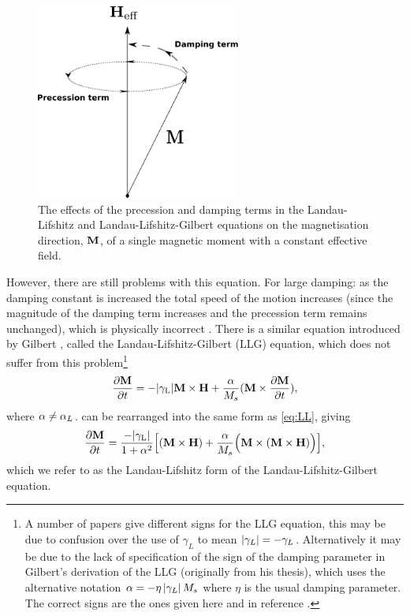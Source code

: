 \begin{figure}
  \centering
  \includegraphics[width=0.6\textwidth]{./images/LLG-terms}
  \caption{The effects of the precession and damping terms in the Landau-Lifshitz and Landau-Lifshitz-Gilbert equations on the magnetisation direction, $\boldsymbol{\mathrm{M}}$, of a single magnetic moment with a constant effective field.}
  \label{fig:LLG-terms}
\end{figure}

However, there are still problems with this equation.
For large damping: as the damping constant is increased the total speed of the motion increases (since the magnitude of the damping term increases and the precession term remains unchanged), which is physically incorrect \cite{Mallinson1987}.
There is a similar equation introduced by Gilbert \cite{Gilbert2004}, called the Landau-Lifshitz-Gilbert (LLG) equation, which does not suffer from this problem\footnote{A number of papers give different signs for the LLG equation, this may be due to confusion over the use of $\gamma_L$ to mean $\left|{\gamma_L} \right| = -\gamma_L$. Alternatively it may be due to the lack of specification of the sign of the damping parameter in Gilbert's derivation of the LLG \cite{Gilbert2004} (originally from his thesis), which uses the alternative notation $\alpha = -\eta \left|{\gamma_L} \right| M_s$ where $\eta$ is the usual damping parameter. The correct signs are the ones given here and in reference \cite{Mallinson2000}.}
\begin{equation}
  \label{eq:Gilbert}
  \frac{\partial \boldsymbol{\mathrm{M}}}{\partial t} = - {\left|{\gamma_{\mathrm{\tiny{L}}}} \right|} \boldsymbol{\mathrm{M}} \times \boldsymbol{\mathrm{H}} + \frac{\alpha}{M_s} (\boldsymbol{\mathrm{M}} \times \frac{\partial \boldsymbol{\mathrm{M}}}{\partial t}),
\end{equation}
where $\alpha \neq \alpha_L$.  can be rearranged into the same form \cite[181]{Aharoni1996} as \cref{eq:LL}, giving
\begin{equation}
  \label{eq:LLG}
  \frac{\partial \boldsymbol{\mathrm{M}}}{\partial t} = \frac{-{\left|{\gamma_{\mathrm{\tiny{L}}}} \right|}}{1 + \alpha^2} \Big[ (\boldsymbol{\mathrm{M}} \times \boldsymbol{\mathrm{H}}) + \frac{\alpha}{M_s} \Big(\boldsymbol{\mathrm{M}} \times (\boldsymbol{\mathrm{M}} \times \boldsymbol{\mathrm{H}}) \Big) \Big],
\end{equation}
which we refer to as the Landau-Lifshitz form of the Landau-Lifshitz-Gilbert equation.


